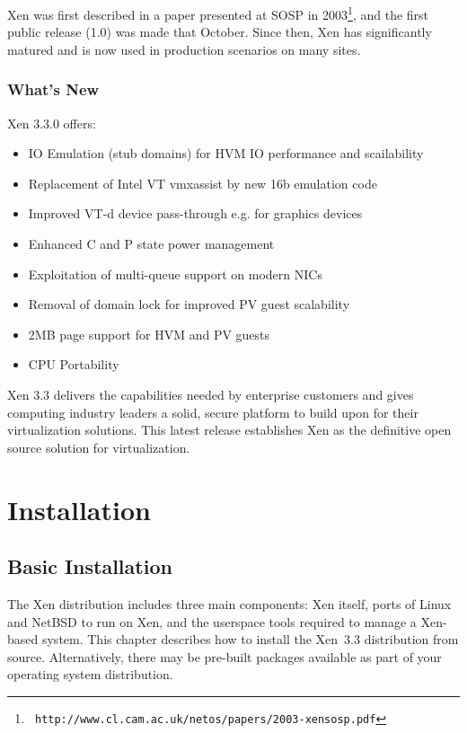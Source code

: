 \documentclass[11pt,twoside,final,openright]{report}
\begin{document}
Xen was first described in a paper presented at SOSP in
2003\footnote{\tt
  http://www.cl.cam.ac.uk/netos/papers/2003-xensosp.pdf}, and the first
public release (1.0) was made that October. Since then, Xen has
significantly matured and is now used in production scenarios on many
sites.

\section{What's New}

Xen 3.3.0 offers:

\begin{itemize}
\item IO Emulation (stub domains) for HVM IO performance and scailability
\item Replacement of Intel VT vmxassist by new 16b emulation code
\item Improved VT-d device pass-through e.g. for graphics devices
\item Enhanced C and P state power management
\item Exploitation of multi-queue support on modern NICs
\item Removal of domain lock for improved PV guest scalability
\item 2MB page support for HVM and PV guests
\item CPU Portability
\end{itemize}

Xen 3.3 delivers the capabilities needed by enterprise customers and gives computing industry leaders a solid, secure platform to build upon for their virtualization solutions. This latest release establishes Xen as the definitive open source solution for virtualization.



\part{Installation}

\chapter{Basic Installation}

The Xen distribution includes three main components: Xen itself, ports
of Linux and NetBSD to run on Xen, and the userspace tools required to
manage a Xen-based system. This chapter describes how to install the
Xen~3.3 distribution from source. Alternatively, there may be pre-built
packages available as part of your operating system distribution.
\end{document}
